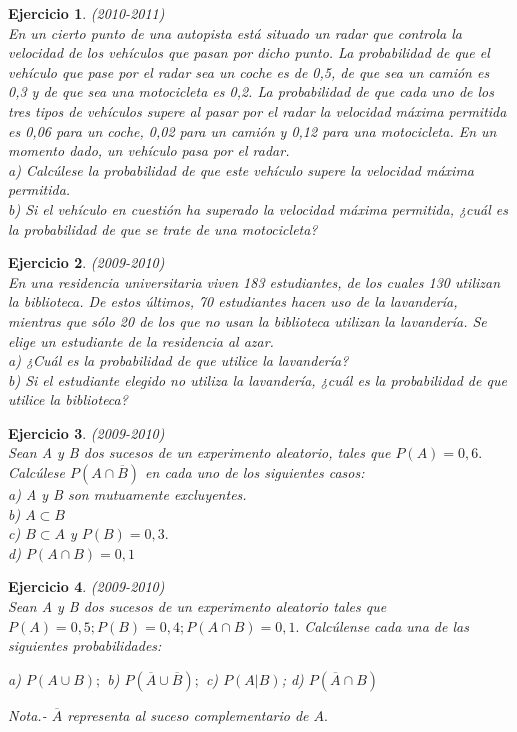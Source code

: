 \documentclass[12pt, a4paper]{amsart}
\newtheorem{ejer}{Ejercicio}
\begin{document}
\begin{ejer}\em (2010-2011)\\
En un cierto punto de una autopista está situado un radar que controla la velocidad de los vehículos que pasan por dicho punto. La probabilidad de que el vehículo que pase por el radar sea un coche es de 0,5, de que sea un camión es 0,3 y de que sea una motocicleta es 0,2. La probabilidad de que cada uno de los tres tipos de vehículos supere al pasar por el radar la velocidad máxima permitida es 0,06 para un coche, 0,02 para un camión y 0,12 para una motocicleta. En un momento dado, un vehículo pasa por el radar.\\
a) Calcúlese la probabilidad de que este vehículo supere la velocidad máxima permitida.\\
b) Si el vehículo en cuestión ha superado la velocidad máxima permitida, ¿cuál es la probabilidad de que se trate de una motocicleta?
\end{ejer}

\begin{ejer}\em (2009-2010)\\%
En una residencia universitaria viven 183 estudiantes, de los cuales 130 utilizan la biblioteca. De estos últimos, 70 estudiantes hacen uso de la lavandería, mientras que sólo 20 de los que no usan la biblioteca utilizan la lavandería. Se elige un estudiante de la residencia al azar.\\
a) ¿Cuál es la probabilidad de que utilice la lavandería?\\
b) Si el estudiante elegido no utiliza la lavandería, ¿cuál es la probabilidad de que utilice la biblioteca?
\end{ejer}

\begin{ejer}\em (2009-2010)\\
Sean A y B dos sucesos de un experimento aleatorio, tales que $P(A) = 0,6.$ Calcúlese $P(A \cap \overline{B})$
en cada uno de los siguientes casos:\\
a) A y B son mutuamente excluyentes.\\
b) $A \subset B$\\
c) $B \subset A$ y $P(B)=0,3.$\\
d) $P(A\cap B)=0,1$
\end{ejer}

\begin{ejer}\em (2009-2010)\\%
Sean A y B dos sucesos de un experimento aleatorio tales que $P(A)=0,5; P(B)=0,4; P(A\cap B)=0,1.$ Calcúlense cada una de las siguientes probabilidades:
\begin{center}
a) $P(A\cup B);$\hspace*{5mm} b) $P(\overline{A}\cup \overline{B});$\hspace*{5mm} c) $P(A|B)$;\hspace*{5mm} d) $P(\overline{A}\cap B)$
\end{center}
Nota.- $\overline{A}$ representa al suceso complementario de $A.$
\end{ejer}
\end{document}
